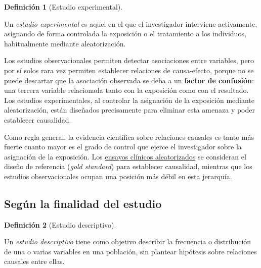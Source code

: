 \documentclass[
  spanish,
  a4paper,
]{scrreport}
\theoremstyle{definition}
\theoremstyle{definition}
\newtheorem{definition}{Definición}[chapter]
\theoremstyle{remark}
\begin{document}
\begin{definition}[Estudio
experimental]\protect\hypertarget{def-estudio-experimental}{}\label{def-estudio-experimental}

Un \emph{estudio experimental} es aquel en el que el investigador
interviene activamente, asignando de forma controlada la exposición o el
tratamiento a los individuos, habitualmente mediante aleatorización.

\end{definition}

Los estudios observacionales permiten detectar asociaciones entre
variables, pero por sí solos rara vez permiten establecer relaciones de
causa-efecto, porque no se puede descartar que la asociación observada
se deba a un \textbf{factor de confusión}: una tercera variable
relacionada tanto con la exposición como con el resultado. Los estudios
experimentales, al controlar la asignación de la exposición mediante
aleatorización, están diseñados precisamente para eliminar esta amenaza
y poder establecer causalidad.

\begin{tcolorbox}[enhanced jigsaw, arc=.35mm, bottomrule=.15mm, bottomtitle=1mm, breakable, colback=white, colbacktitle=quarto-callout-note-color!10!white, colframe=quarto-callout-note-color-frame, coltitle=black, left=2mm, leftrule=.75mm, opacityback=0, opacitybacktitle=0.6, rightrule=.15mm, title=\textcolor{quarto-callout-note-color}{\faInfo}\hspace{0.5em}{Interpretación}, titlerule=0mm, toprule=.15mm, toptitle=1mm]

Como regla general, la evidencia científica sobre relaciones causales es
tanto más fuerte cuanto mayor es el grado de control que ejerce el
investigador sobre la asignación de la exposición. Los
\href{07-estudios-experimentales.qmd}{ensayos clínicos aleatorizados} se
consideran el diseño de referencia (\emph{gold standard}) para
establecer causalidad, mientras que los estudios observacionales ocupan
una posición más débil en esta jerarquía.

\end{tcolorbox}

\subsection{Según la finalidad del
estudio}\label{seguxfan-la-finalidad-del-estudio}

\begin{definition}[Estudio
descriptivo]\protect\hypertarget{def-estudio-descriptivo}{}\label{def-estudio-descriptivo}

Un \emph{estudio descriptivo} tiene como objetivo describir la
frecuencia o distribución de una o varias variables en una población,
sin plantear hipótesis sobre relaciones causales entre ellas.

\end{definition}
\end{document}
